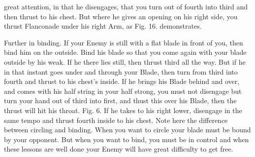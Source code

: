 \newpage


\newpage



great attention, in that he disengages, that you turn out of fourth
into third and then thrust to his chest. But where he gives an opening
on his right side, you thrust Flanconade under his right Arm, as
Fig. 16. demonstrates.

\exercise{}

Further in binding. If your Enemy is still with a flat blade in front
of you, then bind him on the outside. Bind his blade so that you come
again with your blade outside by his weak. If he there lies still,
then thrust third all the way.
But if he in that instant goes under and through your Blade, then
turn from third into fourth and thrust to his chest's inside. If he
brings his Blade behind and over, and comes with his half string in
your half strong, you must not disengage but turn your hand out of
third into first, and thust this over his Blade, then the thrust will
hit his throat. Fig. 6. If he takes to his right lower, disengage in
the same tempo and thrust fourth inside to his chest.
Note here the difference between circling and binding. When you want
to circle your blade must be bound by your opponent. But when you want
to bind, you must be in control and when these lessons are well done
your Enemy will have great difficulty to get free.

